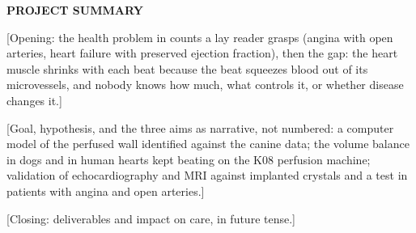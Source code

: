 \documentclass[11pt]{article}
\begin{document}
\linenumbers %

\textbf{PROJECT SUMMARY}

[Opening: the health problem in counts a lay reader grasps (angina with open arteries, heart failure with preserved ejection fraction), then the gap: the heart muscle shrinks with each beat because the beat squeezes blood out of its microvessels, and nobody knows how much, what controls it, or whether disease changes it.]

[Goal, hypothesis, and the three aims as narrative, not numbered: a computer model of the perfused wall identified against the canine data; the volume balance in dogs and in human hearts kept beating on the K08 perfusion machine; validation of echocardiography and MRI against implanted crystals and a test in patients with angina and open arteries.]

[Closing: deliverables and impact on care, in future tense.]
\end{document}

